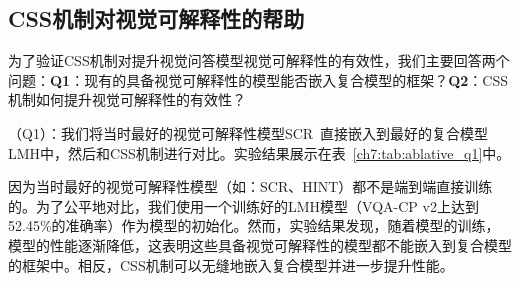 \begin{table}[tbp]
    \begin{center}
    \end{center}
    \caption{不同视觉问答模型在数据集VQA-CP v1上的性能对比}
    \label{ch7:tab:SOTA_v1}
\end{table}


\subsection{CSS机制对视觉可解释性的帮助}

为了验证CSS机制对提升视觉问答模型视觉可解释性的有效性，我们主要回答两个问题：\textbf{Q1}：现有的具备视觉可解释性的模型能否嵌入复合模型的框架？\textbf{Q2}：CSS机制如何提升视觉可解释性的有效性？

\textbf{}（Q1）：我们将当时最好的视觉可解释性模型SCR~\cite{wu2019self}直接嵌入到最好的复合模型LMH中，然后和CSS机制进行对比。实验结果展示在表~\ref{ch7:tab:ablative_q1}中。

因为当时最好的视觉可解释性模型（如：SCR、HINT）都不是端到端直接训练的。为了公平地对比，我们使用一个训练好的LMH模型（VQA-CP v2上达到52.45\%的准确率）作为模型的初始化。然而，实验结果发现，随着模型的训练，模型的性能逐渐降低，这表明这些具备视觉可解释性的模型都不能嵌入到复合模型的框架中。相反，CSS机制可以无缝地嵌入复合模型并进一步提升性能。

